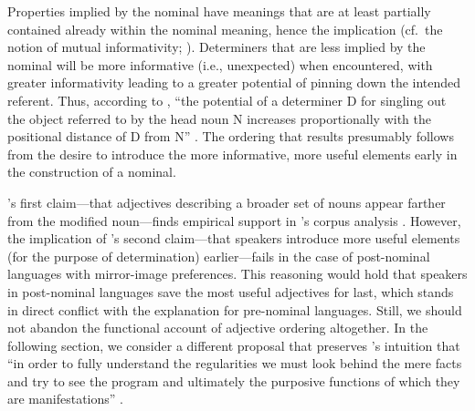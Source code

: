 \documentclass[preprint,authoryear]{elsarticle}\frenchspacing
\begin{document}
Properties implied by the nominal have meanings that are at least partially contained already within the nominal meaning, hence the implication (cf.~the notion of mutual informativity; \citealp{futrell2017}). Determiners that are less implied by the nominal will be more informative (i.e., unexpected) when encountered, with greater informativity leading to a greater potential of pinning down the intended referent.  Thus, according to \citeauthor{seiler1978}, ``the potential of a determiner D for singling out the object referred to by the head noun N increases proportionally with the positional distance of D from N'' \citep[p.~309]{seiler1978}. The ordering that results presumably follows from the desire to introduce the more informative, more useful elements early in the construction of a nominal.

\citeauthor{seiler1978}'s first claim---that adjectives describing a broader set of nouns appear farther from the modified noun---finds empirical support in \citeauthor{wulff2003}'s corpus analysis \citep[pp.~266--267]{wulff2003}. However, the implication of \citeauthor{seiler1978}'s second claim---that speakers introduce more useful elements (for the purpose of determination) earlier---fails in the case of post-nominal languages with mirror-image preferences. This reasoning would hold that speakers in post-nominal languages save the most useful adjectives for last, which stands in direct conflict with the explanation for pre-nominal languages. Still, we should not abandon the functional account of adjective ordering altogether. In the following section, we consider a different proposal that preserves \citeauthor{seiler1978}'s intuition that ``in order to fully understand the regularities we must look behind the mere facts and try to see the program and ultimately the purposive functions of which they are manifestations'' \citep[p.~325]{seiler1978}.

%
%

%
%
%
%
%
%
\end{document}
